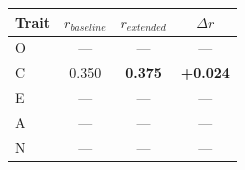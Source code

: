\begin{tabular}{lccc}
\toprule
Trait & $r_{baseline}$ & $r_{extended}$ & $\Delta r$ \\
\midrule
O & --- & --- & --- \\
C & 0.350 & \textbf{0.375} & \textbf{+0.024} \\
E & --- & --- & --- \\
A & --- & --- & --- \\
N & --- & --- & --- \\
\bottomrule
\end{tabular}
